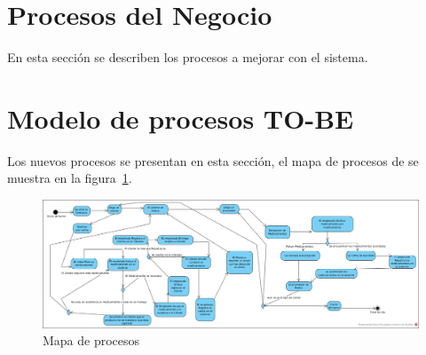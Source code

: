 \newpage


\section{Procesos del Negocio}
En esta sección se describen los procesos a mejorar con el sistema.




\section{Modelo de procesos TO-BE}

Los nuevos procesos se presentan en esta sección, el mapa de procesos de se muestra en la figura~\ref{fig:mapaProc}.

\begin{figure}[htbp]
	\begin{center}
		\includegraphics[width=.8\textwidth]{images/procMap}
		\caption{Mapa de procesos}
		\label{fig:mapaProc}
	\end{center}
\end{figure}


















